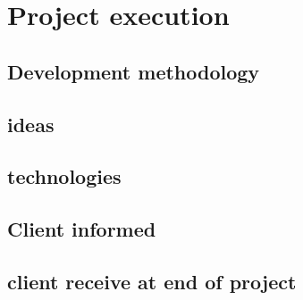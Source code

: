 \documentclass[a4paper,10pt]{article}
\begin{document}
\section{Project execution}
\subsection{Development methodology}
\subsection{ideas}
\subsection{technologies}
\subsection{Client informed}
\subsection{client receive at end of project}
\end{document}
